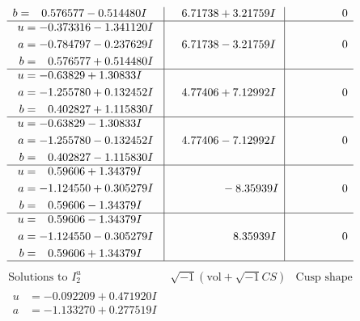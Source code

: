 \documentclass[1p]{elsarticle_modified}
\theoremstyle{definition}
\newcommand{\I}{\sqrt{-1}}
\begin{document}
$$\begin{array}{c|c|c}
\begin{aligned}
b &= \phantom{-}0.576577 - 0.514480 I\end{aligned}
 & \phantom{-}6.71738 + 3.21759 I & \phantom{-0.000000 } 0 \\ \hline\begin{aligned}
u &= -0.373316 - 1.341120 I \\
a &= -0.784797 - 0.237629 I \\
b &= \phantom{-}0.576577 + 0.514480 I\end{aligned}
 & \phantom{-}6.71738 - 3.21759 I & \phantom{-0.000000 } 0 \\ \hline\begin{aligned}
u &= -0.63829 + 1.30833 I \\
a &= -1.255780 + 0.132452 I \\
b &= \phantom{-}0.402827 + 1.115830 I\end{aligned}
 & \phantom{-}4.77406 + 7.12992 I & \phantom{-0.000000 } 0 \\ \hline\begin{aligned}
u &= -0.63829 - 1.30833 I \\
a &= -1.255780 - 0.132452 I \\
b &= \phantom{-}0.402827 - 1.115830 I\end{aligned}
 & \phantom{-}4.77406 - 7.12992 I & \phantom{-0.000000 } 0 \\ \hline\begin{aligned}
u &= \phantom{-}0.59606 + 1.34379 I \\
a &= -1.124550 + 0.305279 I \\
b &= \phantom{-}0.59606 - 1.34379 I\end{aligned}
 & \phantom{-0.000000 } -8.35939 I & \phantom{-0.000000 } 0 \\ \hline\begin{aligned}
u &= \phantom{-}0.59606 - 1.34379 I \\
a &= -1.124550 - 0.305279 I \\
b &= \phantom{-}0.59606 + 1.34379 I\end{aligned}
 & \phantom{-0.000000 -}8.35939 I & \phantom{-0.000000 } 0\\
 \hline 
 \end{array}$$\newpage$$\begin{array}{c|c|c}  
\text{Solutions to }I^u_{2}& \I (\text{vol} + \sqrt{-1}CS) & \text{Cusp shape}\\
 \hline 
\begin{aligned}
u &= -0.092209 + 0.471920 I \\
a &= -1.133270 + 0.277519 I \\

\end{aligned}
\end{array}$$
\end{document}
